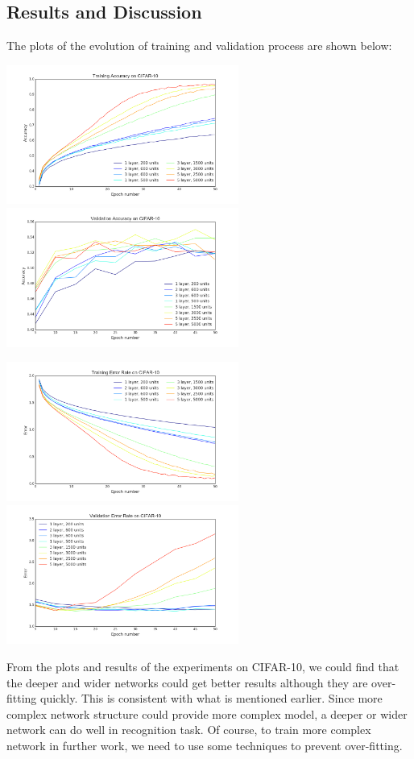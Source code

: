 \documentclass[]{article}
\begin{document}
\subsection{Results and Discussion}
The plots of the evolution of training and validation process are shown below:

\includegraphics[width=3in]{NN_architures_train_acc}
\includegraphics[width=3in]{NN_architures_valid_acc}

\includegraphics[width=3in]{NN_architures_train_err}
\includegraphics[width=3in]{NN_architures_valid_err}

From the plots and results of the experiments on CIFAR-10, we could find that the deeper and wider networks could get better results although they are over-fitting quickly. This is consistent with what is mentioned earlier. Since more complex network structure could provide more complex model, a deeper or wider network can do well in recognition task. Of course, to train more complex network in further work, we need to use some techniques to prevent over-fitting. 
\end{document}
